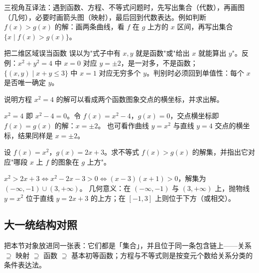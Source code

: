 \begin{explore}
\begin{method}
三视角互译法：遇到函数、方程、不等式问题时，先写出集合（代数），再画图（几何），必要时画箭头图（映射），最后回到代数表达。例如判断 $f(x)>g(x)$ 的解：画两条曲线，看 $f$ 在 $g$ 上方的 $x$ 区间，再写出集合 $\{x\mid f(x)>g(x)\}$。
\end{method}

\begin{commonerror}{把二维区域误当函数}
误以为"式子中有 $x,y$ 就是函数"或"给出 $x$ 就能算出 $y$"。反例：$x^2+y^2=4$ 中 $x=0$ 对应 $y=\pm2$，是一对多，不是函数；$\{(x,y)\mid x+y\leq3\}$ 中 $x=1$ 对应无穷多个 $y$。判别时必须回到单值性：每个 $x$ 是否唯一确定 $y$。
\end{commonerror}

\begin{example}
说明方程 $x^2=4$ 的解可以看成两个函数图象交点的横坐标，并求出解。
\end{example}
\begin{solution}
$x^2=4$ 即 $x^2-4=0$。令 $f(x)=x^2-4$，$g(x)=0$，交点横坐标即 $f(x)=g(x)$ 的解：$x=\pm2$。
也可看作曲线 $y=x^2$ 与直线 $y=4$ 交点的横坐标，结果同样是 $x=\pm2$。
\end{solution}

\begin{problem}
设 $f(x)=x^2$，$g(x)=2x+3$。求不等式 $f(x)>g(x)$ 的解集，并指出它对应"哪段 $x$ 上 $f$ 的图象在 $g$ 上方"。
\end{problem}
\begin{solution}
$x^2>2x+3\iff x^2-2x-3>0\iff(x-3)(x+1)>0$，解集为 $(-\infty,-1)\cup(3,+\infty)$。
几何意义：在 $(-\infty,-1)$ 与 $(3,+\infty)$ 上，抛物线 $y=x^2$ 位于直线 $y=2x+3$ 的上方；在 $[-1,3]$ 上则位于下方（或相交）。
\end{solution}

\subsection{大一统结构对照}

把本节对象放进同一张表：它们都是「集合」，并且位于同一条包含链上——关系 $\supseteq$ 映射 $\supseteq$ 函数 $\supseteq$ 基本初等函数；方程与不等式则是按变元个数给关系分类的条件表达法。


\end{explore}
